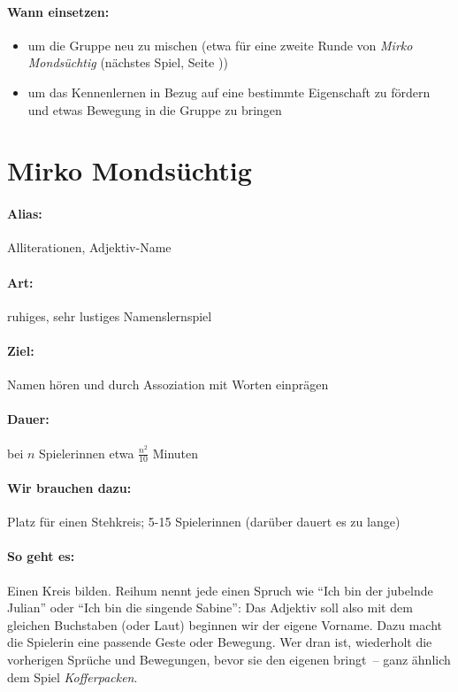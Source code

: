 \paragraph{Wann einsetzen:}
\begin{itemize}
  \item um die Gruppe neu zu mischen (etwa für eine zweite Runde von \emph{Mirko Mondsüchtig} (nächstes Spiel, Seite \pageref{mirko}))
  \item um das Kennenlernen in Bezug auf eine bestimmte Eigenschaft zu fördern und etwas Bewegung in die Gruppe zu bringen
\end{itemize}

\section{Mirko Mondsüchtig}
\label{mirko}
\paragraph{Alias:} Alliterationen, Adjektiv-Name
\paragraph{Art:} ruhiges, sehr lustiges Namenslernspiel
\paragraph{Ziel:} Namen hören und durch Assoziation mit Worten einprägen
\paragraph{Dauer:} bei $n$ Spielerinnen etwa $\frac{n^2}{10}$ Minuten
\paragraph{Wir brauchen dazu:} Platz für einen Stehkreis; 5-15 Spielerinnen (darüber dauert es zu lange)
\paragraph{So geht es:} Einen Kreis bilden. Reihum nennt jede einen Spruch wie "`Ich bin der jubelnde Julian"' oder "`Ich bin die singende Sabine"': Das Adjektiv soll also mit dem gleichen Buchstaben (oder Laut) beginnen wir der eigene Vorname. Dazu macht die Spielerin eine passende Geste oder Bewegung. Wer dran ist, wiederholt die vorherigen Sprüche und Bewegungen, bevor sie den eigenen bringt~-- ganz ähnlich dem Spiel \emph{Kofferpacken}.
